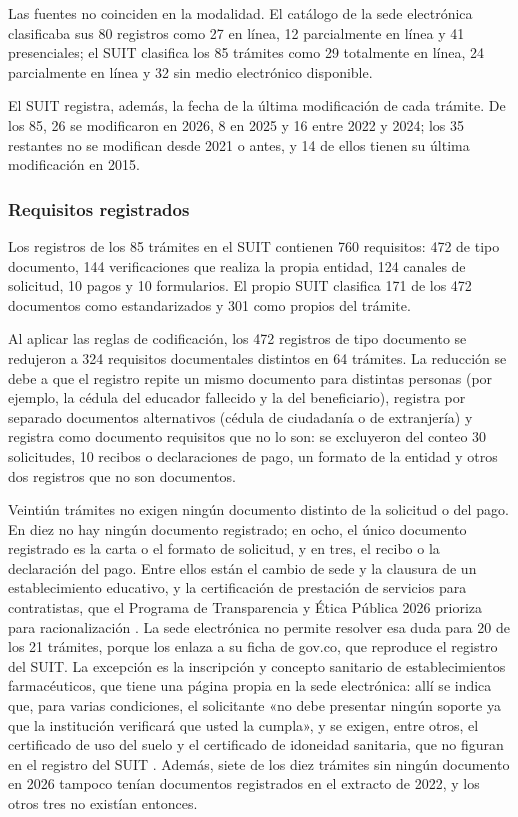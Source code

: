Las fuentes no coinciden en la modalidad. El catálogo de la sede electrónica clasificaba sus 80 registros como 27 en línea, 12 parcialmente en línea y 41 presenciales; el SUIT clasifica los 85 trámites como 29 totalmente en línea, 24 parcialmente en línea y 32 sin medio electrónico disponible.

El SUIT registra, además, la fecha de la última modificación de cada trámite. De los 85, 26 se modificaron en 2026, 8 en 2025 y 16 entre 2022 y 2024; los 35 restantes no se modifican desde 2021 o antes, y 14 de ellos tienen su última modificación en 2015.

\subsubsection{Requisitos registrados}

Los registros de los 85 trámites en el SUIT contienen 760 requisitos: 472 de tipo documento, 144 verificaciones que realiza la propia entidad, 124 canales de solicitud, 10 pagos y 10 formularios. El propio SUIT clasifica 171 de los 472 documentos como estandarizados y 301 como propios del trámite.

Al aplicar las reglas de codificación, los 472 registros de tipo documento se redujeron a 324 requisitos documentales distintos en 64 trámites. La reducción se debe a que el registro repite un mismo documento para distintas personas (por ejemplo, la cédula del educador fallecido y la del beneficiario), registra por separado documentos alternativos (cédula de ciudadanía o de extranjería) y registra como documento requisitos que no lo son: se excluyeron del conteo 30 solicitudes, 10 recibos o declaraciones de pago, un formato de la entidad y otros dos registros que no son documentos.

Veintiún trámites no exigen ningún documento distinto de la solicitud o del pago. En diez no hay ningún documento registrado; en ocho, el único documento registrado es la carta o el formato de solicitud, y en tres, el recibo o la declaración del pago. Entre ellos están el cambio de sede y la clausura de un establecimiento educativo, y la certificación de prestación de servicios para contratistas, que el Programa de Transparencia y Ética Pública 2026 prioriza para racionalización \parencite[p.~135]{gobernaciondelhuila2026ptep}. La sede electrónica no permite resolver esa duda para 20 de los 21 trámites, porque los enlaza a su ficha de gov.co, que reproduce el registro del SUIT. La excepción es la inscripción y concepto sanitario de establecimientos farmacéuticos, que tiene una página propia en la sede electrónica: allí se indica que, para varias condiciones, el solicitante «no debe presentar ningún soporte ya que la institución verificará que usted la cumpla», y se exigen, entre otros, el certificado de uso del suelo y el certificado de idoneidad sanitaria, que no figuran en el registro del SUIT \parencite{gobernaciondelhuila2026tramites}. Además, siete de los diez trámites sin ningún documento en 2026 tampoco tenían documentos registrados en el extracto de 2022, y los otros tres no existían entonces.


